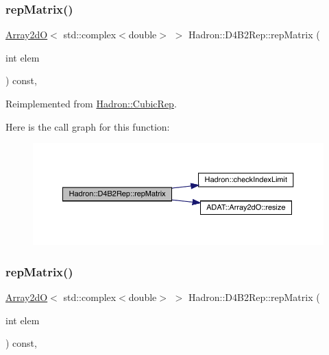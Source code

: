 \subsubsection{\texorpdfstring{repMatrix()}{repMatrix()}\hspace{0.1cm}{\footnotesize\ttfamily [1/3]}}
{\footnotesize\ttfamily \mbox{\hyperlink{classADAT_1_1Array2dO}{Array2dO}}$<$ std\+::complex$<$double$>$ $>$ Hadron\+::\+D4\+B2\+Rep\+::rep\+Matrix (\begin{DoxyParamCaption}\item[{int}]{elem }\end{DoxyParamCaption}) const\hspace{0.3cm}{\ttfamily [inline]}, {\ttfamily [virtual]}}



Reimplemented from \mbox{\hyperlink{structHadron_1_1CubicRep_ac5d7e9e6f4ab1158b5fce3e4ad9e8005}{Hadron\+::\+Cubic\+Rep}}.

Here is the call graph for this function\+:
\nopagebreak
\begin{figure}[H]
\begin{center}
\leavevmode
\includegraphics[width=350pt]{d0/d07/structHadron_1_1D4B2Rep_a245244df26be686b405786bd1df4627e_cgraph}
\end{center}
\end{figure}
\mbox{\label{structHadron_1_1D4B2Rep_a245244df26be686b405786bd1df4627e}} 
\subsubsection{\texorpdfstring{repMatrix()}{repMatrix()}\hspace{0.1cm}{\footnotesize\ttfamily [2/3]}}
{\footnotesize\ttfamily \mbox{\hyperlink{classADAT_1_1Array2dO}{Array2dO}}$<$ std\+::complex$<$double$>$ $>$ Hadron\+::\+D4\+B2\+Rep\+::rep\+Matrix (\begin{DoxyParamCaption}\item[{int}]{elem }\end{DoxyParamCaption}) const\hspace{0.3cm}{\ttfamily [inline]}, {\ttfamily [virtual]}}



